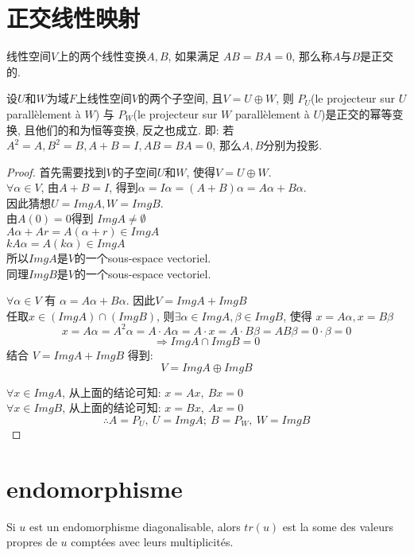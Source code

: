 \documentclass{book}
\begin{document}
\section{正交线性映射}
\begin{definition}
线性空间$V$上的两个线性变换$A, B$, 如果满足 $AB = BA = 0$, 那么称$A$与$B$是正交的.
\end{definition}

\begin{lemma}
设$U$和$W$为域$F$上线性空间$V$的两个子空间, 且$V = U \oplus W$, 则
$P_U$(le projecteur sur $U$ parall\`element \`a $W$) 与
$P_W$(le projecteur sur $W$ parall\`element \`a $U$)是正交的幂等变换, 且他们的和为恒等变换, 反之也成立.
即: 若$A^2 = A, B^2 = B, A + B = I, AB = BA = 0$, 那么$A, B$分别为投影.
\end{lemma}
\begin{proof}
首先需要找到$V$的子空间$U$和$W$, 使得$V = U \oplus W$. \\
$\forall \alpha \in V$, 由$A + B = I$, 得到$\alpha  = I \alpha = (A + B) \alpha = A \alpha + B \alpha$. \\
因此猜想$U = ImgA, W = ImgB$. \\
由$A(0) = 0$得到 $Img A \neq \emptyset$ \\
$A \alpha + A r = A(\alpha + r) \in Img A$ \\
$k A \alpha = A(k \alpha) \in Img A$ \\
所以$ImgA$是$V$的一个sous-espace vectoriel. \\
同理$ImgB$是$V$的一个sous-espace vectoriel.

$\forall \alpha \in V$ 有 $\alpha  = A \alpha + B \alpha$. 因此$V = Img A + Img B$ \\
任取$x \in (Img A) \cap (Img B)$, 则$\exists \alpha \in Img A, \beta \in Img B$, 使得 $x = A \alpha, x = B \beta$ \\
$$x = A \alpha = A^2 \alpha = A \cdot A \alpha = A \cdot x = A \cdot B \beta = AB \beta = 0 \cdot \beta = 0 $$
$$\Rightarrow Img A \cap Img B = 0$$
结合 $V = Img A + Img B$ 得到:
$$V = Img A \oplus Img B$$

$\forall x \in Img A$, 从上面的结论可知: $x = A x,~ B x = 0$ \\
$\forall x \in Img B$, 从上面的结论可知: $x = B x,~ A x = 0$ \\
$$\therefore A = P_U,~ U = Img A;~ B = P_W,~ W = Img B$$
\end{proof}

\section{endomorphisme}
Si $u$ est un endomorphisme diagonalisable, alors $tr(u)$ est la some des valeurs propres de $u$ compt\'ees avec leurs multiplicit\'es.
\end{document}
